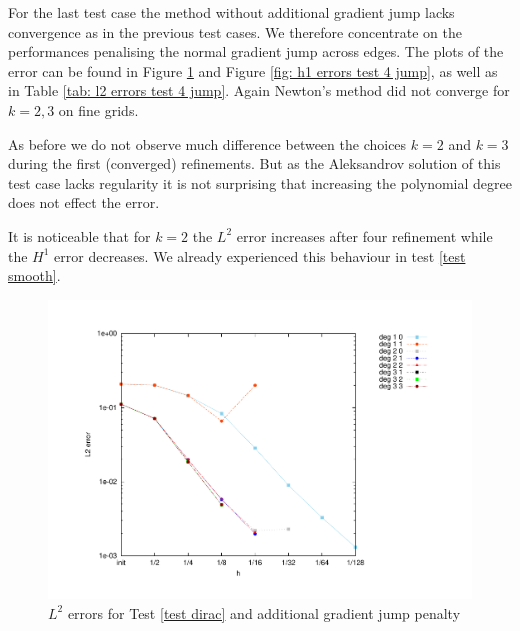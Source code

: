 

For the last test case the method without additional gradient jump lacks convergence as in the previous test cases. We therefore concentrate on the performances penalising the normal gradient jump across edges. The plots of the error can be found in Figure \ref{fig: l2 errors test 4 jump} and Figure \ref{fig: h1 errors test 4 jump}, as well as in Table \ref{tab: l2 errors test 4 jump}. Again Newton's method did not converge for $k=2,3$ on fine grids. 


As before we do not observe much difference between the choices $k=2$ and $k=3$ during the first (converged) refinements. But as the Aleksandrov solution of this test case lacks regularity it is not surprising that increasing the polynomial degree does not effect the error.

It is noticeable that for $k=2$ the $L^2$ error increases after four refinement while the $H^1$ error decreases. We already experienced this behaviour in test \ref{test smooth}.

\begin{figure}[h]
	\centering
		\centering
		\includegraphics[scale =0.4]{plots/MA4_Neilan_GradJump_l2.pdf}
	\caption{$L^2$ errors for Test \ref{test dirac} and additional gradient jump penalty}
	\label{fig: l2 errors test 4 jump}
\end{figure}
	

